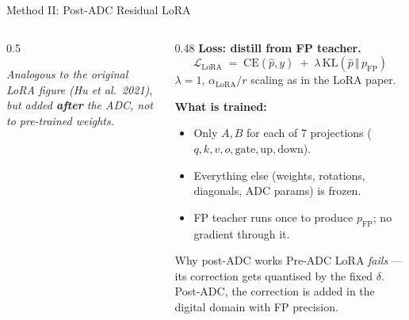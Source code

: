 \begin{frame}[shrink=10]{Method II: Post-ADC Residual LoRA}
\begin{columns}[T]
\begin{column}{0.5\textwidth}
\begin{center}
{}
      \end{center}
      {\scriptsize \emph{Analogous to the original LoRA figure} \textit{(Hu et al.\ 2021)}, \emph{but added \textbf{after} the ADC, not to pre-trained weights.}}
    \end{column}

    \begin{column}{0.48\textwidth}
      \footnotesize
      \textbf{Loss: distill from FP teacher.}
      \[
        \mathcal L_{\mathrm{LoRA}} \;=\; \mathrm{CE}(\hat p, y) \;+\; \lambda\,\mathrm{KL}\!\left(\hat p\,\Vert\, p_{\mathrm{FP}}\right)
      \]
      \vspace{-0.3em}
      \scriptsize $\lambda{=}1$, $\alpha_{\scriptscriptstyle\mathrm{LoRA}}/r$ scaling as in the LoRA paper.

      \vspace{0.4em}
      \pause
      \textbf{What is trained:}
      \begin{itemize}\scriptsize
        \item Only $A, B$ for each of 7 projections ($q,k,v,o,\text{gate},\text{up},\text{down}$).
        \item Everything else (weights, rotations, diagonals, ADC params) is \alert{frozen}.
        \item FP teacher runs once to produce $p_{\mathrm{FP}}$; no gradient through it.
      \end{itemize}

      \pause
      \vspace{0.3em}
      \begin{exampleblock}{Why post-ADC works}
        \scriptsize
        Pre-ADC LoRA \emph{fails} — its correction gets quantised by the fixed $\delta$. Post-ADC, the correction is added in the digital domain with FP precision.
      \end{exampleblock}
    \end{column}
  \end{columns}
\end{frame}
